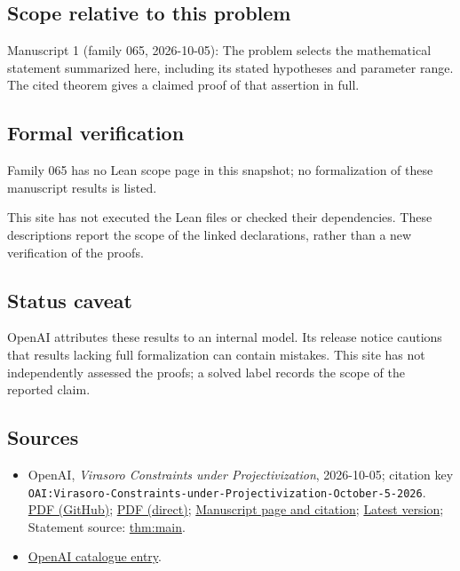 \documentclass[11pt]{article}
\begin{document}
\subsection{Scope relative to this problem}
Manuscript 1 (family 065, 2026-10-05): The problem selects the mathematical statement summarized here, including its stated hypotheses and parameter range. The cited theorem gives a claimed proof of that assertion in full.

\subsection{Formal verification}
Family 065 has no Lean scope page in this snapshot; no formalization of these manuscript results is listed.

This site has not executed the Lean files or checked their dependencies. These descriptions report the scope of the linked declarations, rather than a new verification of the proofs.

\subsection{Status caveat}
OpenAI attributes these results to an internal model. Its release notice cautions that results lacking full formalization can contain mistakes. This site has not independently assessed the proofs; a solved label records the scope of the reported claim.

\subsection{Sources}
\begin{itemize}
\item OpenAI, \emph{Virasoro Constraints under Projectivization}, 2026-10-05; citation key \texttt{OAI:Virasoro-Constraints-under-Projectivization-October-5-2026}. \href{https://github.com/openai/math/blob/adc7f1241b42e322a6451854ab7e4b4c146bf78a/preprints/Virasoro-Constraints-under-Projectivization-October-5-2026/virasoro-constraints-under-projectivization.pdf}{PDF (GitHub)}; \href{https://github.com/openai/math/raw/adc7f1241b42e322a6451854ab7e4b4c146bf78a/preprints/Virasoro-Constraints-under-Projectivization-October-5-2026/virasoro-constraints-under-projectivization.pdf}{PDF (direct)}; \href{https://github.com/openai/math/blob/adc7f1241b42e322a6451854ab7e4b4c146bf78a/preprints/Virasoro-Constraints-under-Projectivization-October-5-2026/README.md}{Manuscript page and citation}; \href{https://github.com/openai/math/blob/main/preprints/Virasoro-Constraints-under-Projectivization-October-5-2026/virasoro-constraints-under-projectivization.pdf}{Latest version}; Statement source: \href{https://github.com/openai/math/blob/adc7f1241b42e322a6451854ab7e4b4c146bf78a/preprints/Virasoro-Constraints-under-Projectivization-October-5-2026/build/sections/01-introduction.tex\#L36}{thm:main}.
\item \href{https://github.com/openai/math/blob/adc7f1241b42e322a6451854ab7e4b4c146bf78a/CONTENTS.md}{OpenAI catalogue entry}.
\end{itemize}
\end{document}
